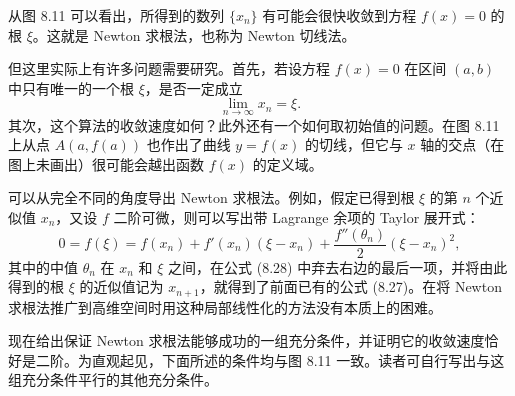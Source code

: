 从图 8.11 可以看出，所得到的数列 $\{x_n\}$ 有可能会很快收敛到方程 $f(x)=0$ 的根 $\xi$。这就是 Newton 求根法，也称为 Newton 切线法。

但这里实际上有许多问题需要研究。首先，若设方程 $f(x)=0$ 在区间 $(a,b)$ 中只有唯一的一个根 $\xi$，是否一定成立
\[
  \lim_{n\to\infty}x_n=\xi.
\]
其次，这个算法的收敛速度如何？此外还有一个如何取初始值的问题。在图 8.11 上从点 $A(a,f(a))$ 也作出了曲线 $y=f(x)$ 的切线，但它与 $x$ 轴的交点（在图上未画出）很可能会越出函数 $f(x)$ 的定义域。

可以从完全不同的角度导出 Newton 求根法。例如，假定已得到根 $\xi$ 的第 $n$ 个近似值 $x_n$，又设 $f$ 二阶可微，则可以写出带 Lagrange 余项的 Taylor 展开式：
\begin{equation}
  0=f(\xi)=f(x_n)+f'(x_n)(\xi-x_n)+\frac{f''(\theta_n)}2(\xi-x_n)^2,
  \tag{8.28}
  \label{eq:8.28}
\end{equation}
其中的中值 $\theta_n$ 在 $x_n$ 和 $\xi$ 之间，在公式 (8.28) 中弃去右边的最后一项，并将由此得到的根 $\xi$ 的近似值记为 $x_{n+1}$，就得到了前面已有的公式 (8.27)。在将 Newton 求根法推广到高维空间时用这种局部线性化的方法没有本质上的困难。

现在给出保证 Newton 求根法能够成功的一组充分条件，并证明它的收敛速度恰好是二阶。为直观起见，下面所述的条件均与图 8.11 一致。读者可自行写出与这组充分条件平行的其他充分条件。

